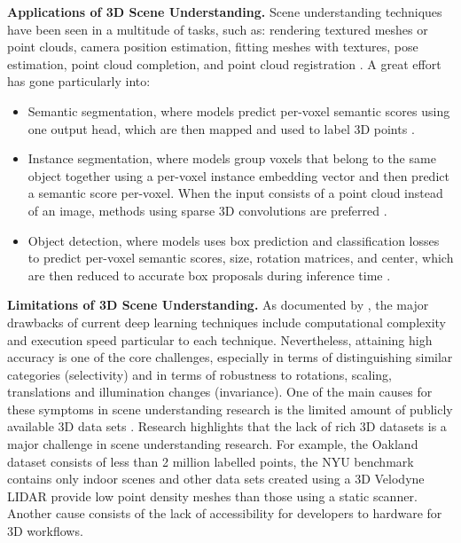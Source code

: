 \textbf{Applications of 3D Scene Understanding.}
Scene understanding techniques have been seen in a multitude of tasks, such as: rendering textured meshes or point clouds, camera position estimation, fitting meshes with textures, pose estimation, point cloud completion, and point cloud registration \cite{najibi2020dops, ravi2020pytorch3d}. A great effort has gone particularly into:
\begin{itemize}
    \item Semantic segmentation, where models predict per-voxel semantic scores using one output head, which are then mapped and used to label 3D points \cite{najibi2020dops, hackel2017semantic3d, qi2017pointnet, qi2017pointnet++}.
    \item Instance segmentation, where models group voxels that belong to the same object together using a per-voxel instance embedding vector and then predict a semantic score per-voxel. When the input consists of a point cloud instead of an image, methods using sparse 3D convolutions are preferred \cite{najibi2020dops, jiang2020pointgroup}.
    \item Object detection, where models uses box prediction and classification losses to predict per-voxel semantic scores, size, rotation matrices, and center, which are then reduced to accurate box proposals during inference time \cite{najibi2020dops, qi2019deep}. 
\end{itemize}

\textbf{Limitations of 3D Scene Understanding.}
As documented by \textcite{surendran2020scene}, the major drawbacks of current deep learning techniques include computational complexity and execution speed particular to each technique. Nevertheless, attaining high accuracy is one of the core challenges, especially in terms of distinguishing similar categories (selectivity) and in terms of robustness to rotations, scaling, translations and illumination changes (invariance).
One of the main causes for these symptoms in scene understanding research is the limited amount of publicly available 3D data sets \cite{han2019image}.
Research \cite{hackel2017semantic3d} highlights that the lack of rich 3D datasets is a major challenge in scene understanding research. For example, the Oakland dataset consists of less than 2 million labelled points, the NYU benchmark contains only indoor scenes and other data sets created using a 3D Velodyne LIDAR provide low point density meshes than those using a static scanner.
Another cause consists of the lack of accessibility for developers to hardware \cite{singh2018fotonnet} for 3D workflows. 

